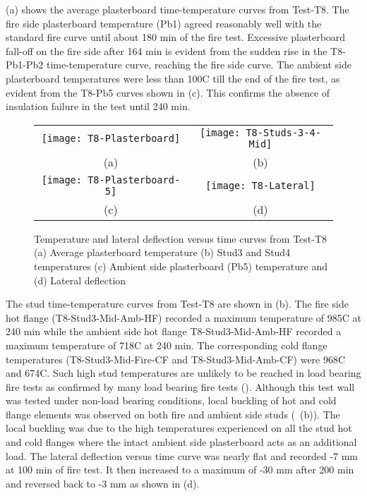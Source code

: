  (a) shows the average plasterboard time-temperature curves from Test-T8. The fire side plasterboard temperature (Pb1) agreed reasonably well with the standard fire curve until about 180 min of the fire test. Excessive plasterboard fall-off on the fire side after 164 min is evident from the sudden rise in the T8-Pb1-Pb2 time-temperature curve, reaching the fire side curve. The ambient side plasterboard temperatures were less than 100\degree C till the end of the fire test, as evident from the T8-Pb5 curves shown in  (c). This confirms the absence of insulation failure in the test until 240 min.
\begin{figure}[!htbp]
	\centering
		\begin{tabular}{cc}
			\texttt{[image: T8-Plasterboard]} & \texttt{[image: T8-Studs-3-4-Mid]}\\
			(a) & (b)  \\ 
			\texttt{[image: T8-Plasterboard-5]} & \texttt{[image: T8-Lateral]} \\ 
			(c) & (d)  \\ 
		\end{tabular} 
		\caption{Temperature and lateral deflection versus time curves from Test-T8 (a) Average plasterboard temperature (b) Stud3 and Stud4 temperatures (c) Ambient side plasterboard (Pb5) temperature and (d) Lateral deflection}
		\label{fig:T8-PB-Stud-Lateral}
\end{figure}

The stud time-temperature curves from Test-T8 are shown in  (b). The fire side hot flange (T8-Stud3-Mid-Amb-HF) recorded a maximum temperature of 985\degree C at 240 min while the ambient side hot flange T8-Stud3-Mid-Amb-HF recorded a maximum temperature of 718\degree C at 240 min. The corresponding cold flange temperatures (T8-Stud3-Mid-Fire-CF and T8-Stud3-Mid-Amb-CF) were 968\degree C and 674\degree C. Such high stud temperatures are unlikely to be reached in load bearing fire tests as confirmed by many load bearing fire tests (\citet{Feng2005,Chen2012a,Kodur2013,Magarabooshanam2019}). Although this test wall was tested under non-load bearing conditions, local buckling of hot and cold flange elements was observed on both fire and ambient side studs (~(b)). The local buckling was due to the high temperatures experienced on all the stud hot and cold flanges where the intact ambient side plasterboard acts as an additional load. The lateral deflection versus time curve was nearly flat and recorded -7 mm at 100 min of fire test. It then increased to a maximum of -30 mm after 200 min and reversed back to -3 mm as shown in  (d).

